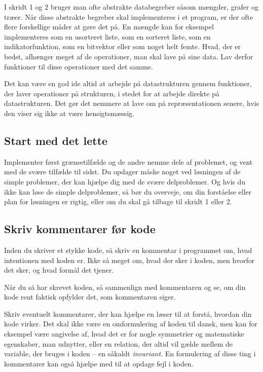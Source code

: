 \documentclass[a4paper,12pt]{article}
\begin{document}
I skridt 1 og 2 bruger man ofte abstrakte databegreber såsom mængder,
grafer og træer.  Når disse abstrakte begreber skal implementeres i et
program, er der ofte flere forskellige måder at gøre det på.  En
mængde kan for eksempel implementeres som en usorteret liste, som en
sorteret liste, som en indikatorfunktion, som en bitvektor eller som
noget helt femte.  Hvad, der er bedst, afhænger meget af de
operationer, man skal lave på sine data.  Lav derfor funktioner til
disse operationer med det samme.

Det kan være en god ide altid at arbejde på datastrukturen gennem
funktioner, der laver operationer på strukturen, i stedet for at
arbejde direkte på datastrukturen.  Det gør det nemmere at lave om på
repræsentationen senere, hvis den viser sig ikke at være
hensigtsmæssig.

\subsection*{Start med det lette}

Implementer først grænsetilfælde og de andre nemme dele af problemet,
og vent med de svære tilfælde til sidst.  Du opdager måske noget ved
løsningen af de simple problemer, der kan hjælpe dig med de svære
delproblemer.  Og hvis du ikke kan løse de simple delproblemer, så bør
du overveje, om din forståelse eller plan for løsningen er rigtig,
eller om du skal gå tilbage til skridt 1 eller 2.

\subsection*{Skriv kommentarer før kode}

Inden du skriver et stykke kode, så skriv en kommentar i programmet
om, hvad intentionen med koden er.  Ikke så meget om, hvad der sker i
koden, men hvorfor det sker, og hvad formål det tjener.

Når du så har skrevet koden, så sammenlign med kommentaren og se, om
din kode rent faktisk opfylder det, som kommentaren siger.

Skriv eventuelt kommentarer, der kan hjælpe en læser til at forstå,
hvordan din kode virker.  Det skal ikke være en omformulering af koden
til dansk, men kan for eksempel være angivelse af, hvad det er for
nogle symmetrier og matematiske egenskaber, man udnytter, eller en
relation, der altid vil gælde mellem de variable, der bruges i koden
-- en såkaldt \emph{invariant}.  En formulering af disse ting i
kommentarer kan også hjælpe med til at opdage fejl i koden.
\end{document}
